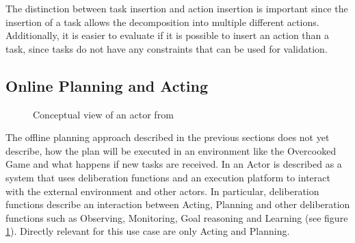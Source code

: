 The distinction between task insertion and action insertion is important since the insertion of a task allows the decomposition into multiple different actions.
Additionally, it is easier to evaluate if it is possible to insert an action than a task, since tasks do not have any constraints that can be used for validation.




\subsection{Online Planning and Acting}\label{sec:acting}

\begin{figure}
  \centering
  \caption[Conceptual view of an actor]{Conceptual view of an actor from \cite{ghallabAutomatedPlanningActing2016}}
  \label{fig:background-acting-conceptual}
\end{figure}

The offline planning approach described in the previous sections does not yet describe, how the plan will be executed in an environment like the Overcooked Game and what happens if new tasks are received.
In \cite{ghallabAutomatedPlanningActing2016} an Actor is described as a system that uses deliberation functions and an execution platform to interact with the external environment and other actors.
In particular, deliberation functions describe an interaction between Acting, Planning and other deliberation functions such as Observing, Monitoring, Goal reasoning and Learning \citep{ingrandDeliberationAutonomousRobots2017} (see figure \ref{fig:background-acting-conceptual}).
Directly relevant for this use case are only Acting and Planning.




